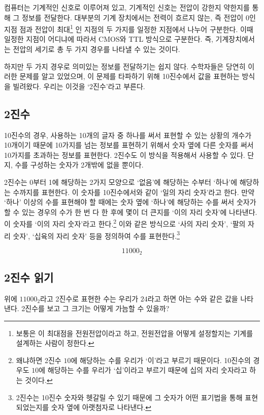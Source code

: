 \documentclass{article}
\begin{document}
컴퓨터는 기계적인 신호로 이루어져 있고, 기계적인 신호는 전압이 강한지 약한지를 통해
그 정보를 전달한다. 대부분의 기계 장치에서는 전력이 흐르지 않는, 즉 전압이 0인 지점
점과 전압이 최대\footnote{보통은 이 최대점을 전원전압이라고 하고, 전원전압을 어떻게
설정할지는 기계를 설계하는 사람이 정한다.}
인 지점의 두 가지를 일정한 지점에서 나누어 구분한다.
이때 일정한 지점이 어디냐에 따라서 CMOS와 TTL 방식으로 구분한다.
즉, 기계장치에서는 전압의 세기로 총 두 가지 경우를 나타낼 수 있는 것이다.

하지만 두 가지 경우로 의미있는 정보를 전달하기는 쉽지 않다. 수학자들은 당연히 이러한
문제를 알고 있었으며, 이 문제를 타파하기 위해 10진수에서 값을 표현하는 방식을 빌려왔다.
우리는 이것을 `2진수'라고 부른다.

\subsection{2진수}

10진수의 경우, 사용하는 10개의 글자 중 하나를 써서 표현할 수 있는 상황의 개수가
10개이기 때문에 10가지를 넘는 정보를 표현하기 위해서 숫자 옆에 다른 숫자를 써서
10가지를 초과하는 정보를 표현한다. 2진수도 이 방식을 적용해서 사용할 수 있다.
단지, 수를 구성하는 숫자가 2개밖에 없을 뿐이다.

2진수는 0부터 1에 해당하는 2가지 모양으로 `없음'에 해당하는 수부터 `하나'에
해당하는 수까지를 표현한다. 이 숫자를 10진수에서와 같이 `일의 자리 숫자'라고 한다.
만약 `하나' 이상의 수를 표현해야 할 때에는 숫자 옆에 `하나'에 해당하는 수를 써서
숫자가 할 수 있는 경우의 수가 한 번 다 한 후에 몇이 더 큰지를 `이의 자리 숫자'에
나타낸다. 이 숫자를 `이의 자리 숫자'라고 한다.\footnote{왜냐하면 2진수 $10$에
해당하는 수를 우리가 `이'라고 부르기 때문이다. 10진수의 경우도 $10$에 해당하는
수를 우리가 `십'이라고 부르기 때문에 십의 자리 숫자라고 하는 것이다.}
이와 같은 방식으로 `사의 자리 숫자', `팔의 자리 숫자', `십육의 자리 숫자' 등을
정의하여 수를 표현한다.\footnote{2진수는 10진수 숫자와 헷갈릴 수 있기 때문에 
그 숫자가 어떤 표기법을 통해 표현되었는지를 숫자 옆에 아랫첨자로 나타낸다.}

$$
11000_2
$$

\subsection{2진수 읽기}

위에 $11000_2$라고 2진수로 표현한 수는 우리가 $24$라고 하면 아는 수와 같은 값을
나타낸다. 2진수를 보고 그 크기는 어떻게 가늠할 수 있을까?
\end{document}
